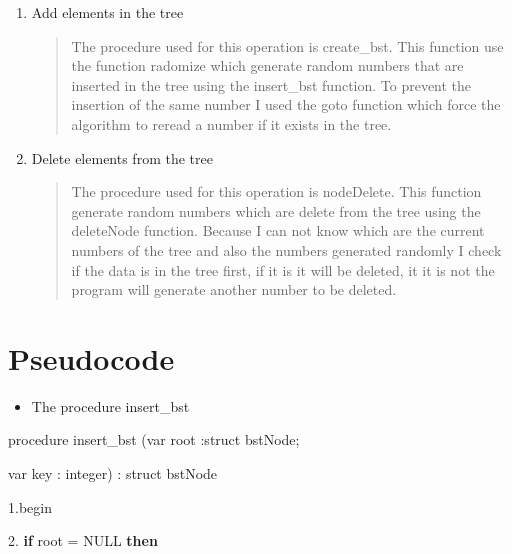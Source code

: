\documentclass{article}
\begin{document}
\begin{enumerate}
\begin{quotation}
The procedure for this task is named "search\_node" and takes two parameters, one of type bstNode, which is the adress of the root, and one integer which is the value we want to find. First we compare the given value with the data stored in the node, if it is greater than the node's data we move the search in the right subtree, else we are looking for the value in the left sub-tree. Once we find the value we retuen its adress.
\end{quotation}
\item Add elements in the tree
\begin{quotation}
The procedure used for this operation is create\_bst. This function use the function radomize which generate random numbers that are inserted in the tree using the insert\_bst function. To prevent the insertion of the same number I used the goto function which force the algorithm to reread a number if it exists in the tree. 
\end{quotation}
\item Delete elements from the tree
\begin{quotation}
The procedure used for this operation is nodeDelete. This function generate random numbers which are delete from the tree using the deleteNode function. Because I can not know which are the current numbers of the tree and also the numbers generated randomly I check if the data is in the tree first, if it is it will be deleted, it it is not the program will generate another number to be deleted.
\end{quotation}
\end{enumerate}
\indent  \indent   \indent    \indent  \indent   \indent  \indent

\section{Pseudocode}
\begin{itemize}
    \item The procedure insert\_bst
\end{itemize}

procedure insert\_bst (var root :struct bstNode; 

\indent  \indent   \indent    \indent  \indent   \indent  \indent
  var key : integer) : struct bstNode
  
  
1.\indent  begin

2.\hspace{40pt} {\bf if} root = NULL {\bf then}
\end{document}
